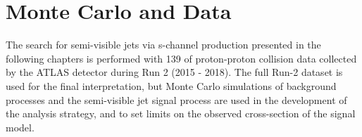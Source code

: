 \chapter{Monte Carlo and Data}
\label{ch:mc_data}

The search for semi-visible jets via s-channel production presented in the following chapters is performed with 139 \fb of proton-proton collision data collected by the ATLAS detector during Run 2 (2015 - 2018). The full Run-2 dataset is used for the final interpretation, but Monte Carlo simulations of background processes and the semi-visible jet signal process are used in the development of the analysis strategy, and to set limits on the observed cross-section of the signal model. 